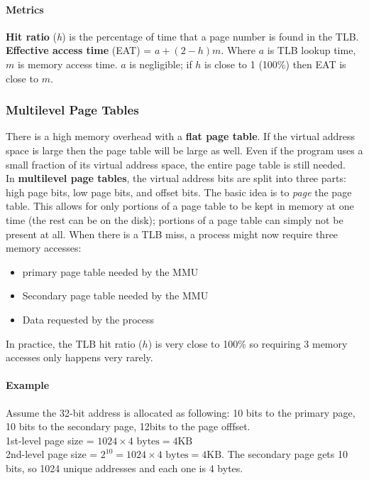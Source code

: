 \documentclass{article}
\newcommand{\bold}[1]{\textbf{#1}}
\renewcommand{\b}{\item[$\circ$]}
\newcommand{\newlist}{\begin{itemize}}
\renewcommand{\endlist}{\end{itemize}}
\begin{document}
\paragraph{Metrics}

\bold{Hit ratio} (\emph{h}) is the percentage of time that a page number is found in the TLB. \\ 

\bold{Effective access time} (EAT) = $a + (2-h)m$. Where $a$ is TLB lookup time, $m$ is memory access time. $a$ is negligible; if $h$ is close to 1 (100\%) then EAT is close to $m$. 

\subsubsection{Multilevel Page Tables}

There is a high memory overhead with a \bold{flat page table}. If the virtual address space is large then the page table will be large as well. Even if the program uses a small fraction of its virtual address space, the entire page table is still needed. \\

In \bold{multilevel page tables}, the virtual address bits are split into three parts: high page bits, low page bits, and offset bits. The basic idea is to \emph{page} the page table. This allows for only portions of a page table to be kept in memory at one time (the rest can be on the disk); portions of a page table can simply not be present at all. When there is a TLB miss, a process might now require three memory accesses: 

\newlist
\b primary page table needed by the MMU
\b Secondary page table needed by the MMU
\b Data requested by the process
\endlist

In practice, the TLB hit ratio ($h$) is very close to 100\% so requiring 3 memory accesses only happens very rarely. 
\paragraph{Example}

Assume the 32-bit address is allocated as following: 10 bits to the primary page, 10 bits to the secondary page, 12bits to the page offfset. \\ 

1st-level page size = $1024 \times 4 \textrm{ bytes} = 4\textrm{KB}$ \\ 

2nd-level page size = $2^{10} = 1024 \times 4 \textrm{ bytes} = 4\textrm{KB}$. The secondary page gets 10 bits, so 1024 unique addresses and each one is 4 bytes.
\end{document}
